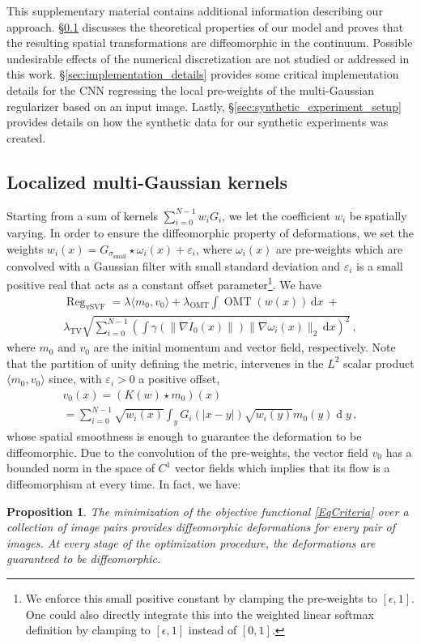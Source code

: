 \documentclass[10pt,twocolumn,letterpaper,table]{article}
\numberwithin{equation}{section}
\theoremstyle{plain}
\newtheorem{proposition}[theorem]{Proposition}
\theoremstyle{definition}
\let\on=\operatorname
\newcommand{\ud}{\,\mathrm{d}}
\begin{document}
This supplementary material contains additional information describing our approach. \S\ref{sec:sqrt_model} discusses the theoretical properties of our model and proves that the resulting spatial transformations are diffeomorphic in the continuum. Possible undesirable effects of the numerical discretization are not studied or addressed in this work. \S\ref{sec:implementation_details} provides some critical implementation details for the CNN regressing the local pre-weights of the multi-Gaussian regularizer based on an input image. Lastly, \S\ref{sec:synthetic_experiment_setup} provides details on how the synthetic data for our synthetic experiments was created.

\subsection{Localized multi-Gaussian kernels}
\label{sec:sqrt_model}

Starting from a sum of kernels 
$\sum_{i = 0}^{N-1} w_i G_i$, we let the coefficient $w_i$ be spatially varying. In order to ensure the diffeomorphic property of deformations, we set the weights $w_i(x) = G_{\sigma_{\text{small}}} \star \omega_i(x) + \varepsilon_i$, where $\omega_i(x)$ are pre-weights which are convolved with a Gaussian filter with small standard deviation and $\varepsilon_i$ is a small positive real that acts as a constant offset parameter\footnote{We enforce this small positive constant by clamping the pre-weights to $[\epsilon,1]$. One could also directly integrate this into the weighted linear softmax definition by clamping to $[\epsilon,1]$ instead of $[0,1]$.}. We have
\begin{multline}\label{EqCriteria}
\on{Reg}_{\text{vSVF}} = \lambda \langle m_0,v_0 \rangle + \lambda_{\text{OMT}}\int \on{OMT}(w(x)) \ud x~+ \\ \lambda_{\text{TV}}\sqrt{\sum_{i=0}^{N-1}\left(\int \gamma(\| \nabla I_0(x)\|) \| \nabla \omega_i(x)\|_{2} \ud x\right)^2}\,,
\end{multline}
where $m_0$ and $v_0$ are the initial momentum and vector field, respectively. Note that the partition of unity defining the metric, intervenes in the $L^2$ scalar product $\langle m_0,v_0 \rangle$ since, with $\varepsilon_i > 0$ a positive offset,
\begin{multline}\label{EqNewSmoothing}
v_0(x) =( K(w) \star m_0)(x) \\= \sum_{i = 0}^{N-1} \sqrt{w_i(x)} \int_{y} G_i(| x - y |) \sqrt{w_i(y)} m_0(y) \on{d}\!y\,,
\end{multline}
whose spatial smoothness is enough to guarantee the deformation to be diffeomorphic.
Due to the convolution of the pre-weights, the vector field $v_0$ has a bounded norm in the space of $C^1$ vector fields which implies that its flow is a diffeomorphism at every time.
In fact, we have:
\begin{proposition}
The minimization of the objective functional \eqref{EqCriteria} over a collection of image pairs provides diffeomorphic deformations for every pair of images. At every stage of the optimization procedure, the deformations are guaranteed to be diffeomorphic.
\end{proposition}
\end{document}
